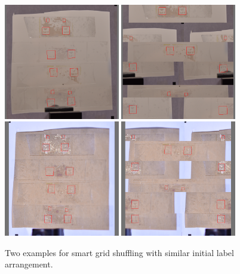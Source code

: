 \documentclass[10pt]{book}
\begin{document}
\begin{figure}
  \centering
     {\includegraphics[width=0.45\textwidth]{image/aug_sgs_before}}
     {\includegraphics[width=0.45\textwidth]{image/aug_sgs_after}}
     {\includegraphics[width=0.45\textwidth]{image/aug_sgs_before2}}
     {\includegraphics[width=0.45\textwidth]{image/aug_sgs_after2}}
  \caption{Two examples for smart grid shuffling with similar initial label arrangement.}
  \label{fig:aug_sgs_example}
\end{figure}
\end{document}
